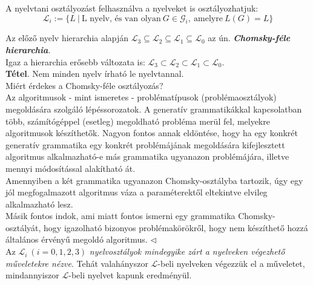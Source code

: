 \documentclass[12pt,margin=0px]{article}
\begin{document}
    \noindent A nyelvtani osztályozást felhasználva a nyelveket is osztályozhatjuk:
    \[
        \mathcal{L}_{i} := \Big\{L\ \big|\ \text{L nyelv, és van olyan}\ G \in \mathcal{G}_{i},\ \text{amelyre}\ L(G) = L \Big\}
    \]

    \noindent Az előző nyelv hierarchia alapján $ \mathcal{L}_3 \subseteq \mathcal{L}_2 \subseteq \mathcal{L}_1 \subseteq \mathcal{L}_0 $ az ún. \textbf{\emph{Chomsky-féle hierarchia}}.\\

    \noindent Igaz a hierarchia erősebb változata is: $\mathcal{L}_3 \subset \mathcal{L}_2 \subset \mathcal{L}_1 \subset \mathcal{L}_0$.\\

    \noindent \textbf{Tétel}. Nem minden nyelv írható le nyelvtannal.\\

    {\footnotesize \noindent {\color{blue} \faLightbulbO\ $\triangleright$ } }
    {\footnotesize
    \noindent Miért érdekes a Chomsky-féle osztályozás?\\

     \noindent Az algoritmusok - mint ismeretes - problématípusok (problémaosztályok) megoldására szolgáló lépéssorozatok. A generatív grammatikákkal kapcsolatban több, számítógéppel (esetleg) megoldható probléma merül fel, melyekre algoritmusok készíthetők. Nagyon fontos annak eldöntése, hogy ha egy konkrét generatív grammatika egy konkrét problémájának  megoldására kifejlesztett algoritmus alkalmazható-e más grammatika ugyanazon problémájára, illetve mennyi módosítással alakítható át.\\

     \noindent Amennyiben a két grammatika ugyanazon Chomsky-osztályba tartozik, úgy egy jól megfogalmazott algoritmus váza a paraméterektől eltekintve elvileg alkalmazható lesz.\\

     \noindent Másik  fontos  indok,  ami  miatt  fontos  ismerni  egy  grammatika  Chomsky-osztályát,  hogy  igazolható  bizonyos  problémakörökről,  hogy  nem  készíthető  hozzá  általános  érvényű megoldó algoritmus.
    $\triangleleft$ \faLightbulbO}\\

    \noindent Az $\mathcal{L}_i \ (i=0,1,2,3)$ \emph{nyelvosztályok mindegyike zárt a nyelveken végezhető műveletekre nézve}. Tehát valahányszor $\mathcal{L}$-beli nyelveken végezzük el a műveletet, mindannyiszor $\mathcal{L}$-beli nyelvet kapunk eredményül. \\
\end{document}
